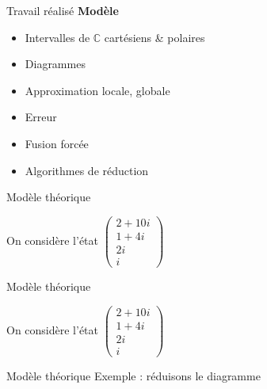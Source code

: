 \begin{frame}{Travail réalisé}
  \textbf{Modèle}
  \begin{itemize}
      \item[\checkmark] Intervalles de $\mathbb C$ cartésiens \& polaires
      \item[\checkmark] Diagrammes
      \item[\checkmark] Approximation locale, globale
      \item[\checkmark] Erreur
      \item[\checkmark] Fusion forcée
      \item[\checkmark] Algorithmes de réduction
  \end{itemize}
\end{frame}

\begin{frame}{Modèle théorique}

  On considère l'état $\begin{pmatrix}
  2+10i \\ 1+4i \\ 2i \\ i
  \end{pmatrix}$

\end{frame}

\begin{frame}{Modèle théorique} %

  On considère l'état $\begin{pmatrix}
  2+10i \\ 1+4i \\ 2i \\ i
  \end{pmatrix}$

\end{frame}


\begin{frame}{Modèle théorique}
  Exemple : réduisons le diagramme
  \begin{center}
  \end{center}
\end{frame}

